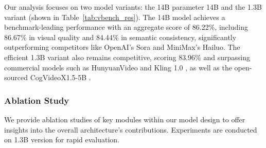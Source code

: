 Our analysis focuses on two model variants: the 14B parameter \method 14B and the \method 1.3B variant (shown in Table~\ref{tab:vbench_res}). The \method 14B model achieves a benchmark-leading performance with an aggregate score of 86.22\%, including 86.67\% in visual quality and 84.44\% in semantic consistency, significantly outperforming competitors like OpenAI's Sora and MiniMax's Hailuo. The efficient \method 1.3B variant also remains competitive, scoring 83.96\% and surpassing commercial models such as HunyuanVideo \citep{kong2024hunyuanvideo} and Kling 1.0 \citep{kuaishou2024kling}, as well as the open-sourced CogVideoX1.5-5B \citep{cogvideox}.
\begin{table}[h]
    \centering
    \small
    \renewcommand{\arraystretch}{1.3} 
    \caption{Model performance scores on Vbench.}
    \label{tab:vbench_res}

\end{table}

\subsubsection{Ablation Study}
\label{subsubsec:ablation}

We provide ablation studies of key modules within our model design to offer insights into the overall architecture's contributions. Experiments are conducted on 1.3B version for rapid evaluation.

